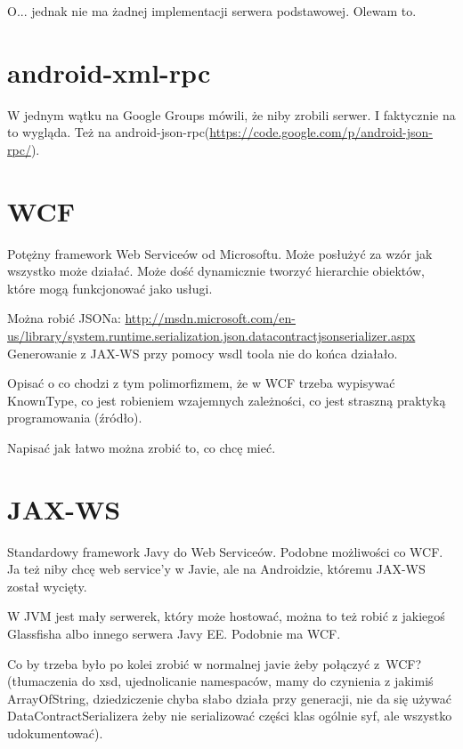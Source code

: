 O... jednak nie ma żadnej implementacji serwera podstawowej. Olewam to.



\section{android-xml-rpc}
W jednym wątku na Google Groups \cite{android-rpc-thread} mówili, że niby zrobili serwer. I faktycznie na to wygląda.
Też na android-json-rpc(\url{https://code.google.com/p/android-json-rpc/}).



\section{WCF}
Potężny framework Web Serviceów od Microsoftu. Może posłużyć za wzór jak wszystko może działać. Może dość dynamicznie tworzyć hierarchie obiektów, które mogą funkcjonować jako usługi.

Można robić JSONa: \url{http://msdn.microsoft.com/en-us/library/system.runtime.serialization.json.datacontractjsonserializer.aspx}\\

Generowanie z JAX-WS przy pomocy wsdl toola nie do końca działało.

Opisać o co chodzi z tym polimorfizmem, że w WCF trzeba wypisywać KnownType, co jest robieniem wzajemnych zależności, co jest straszną praktyką programowania (źródło).

Napisać jak łatwo można zrobić to, co chcę mieć.



\section{JAX-WS}
Standardowy framework Javy do Web Serviceów. Podobne możliwości co WCF\@. Ja też niby chcę web service'y w Javie, ale na Androidzie, któremu JAX-WS został wycięty.

W JVM jest mały serwerek, który może hostować, można to też robić z jakiegoś Glassfisha albo innego serwera Javy EE\@. Podobnie ma WCF.

Co by trzeba było po kolei zrobić w normalnej javie żeby połączyć z~WCF? (tłumaczenia do xsd, ujednolicanie namespaców, mamy do czynienia z jakimiś ArrayOfString, dziedziczenie chyba słabo działa przy generacji, nie da się używać DataContractSerializera żeby nie serializować części klas ogólnie syf, ale wszystko udokumentować). 

